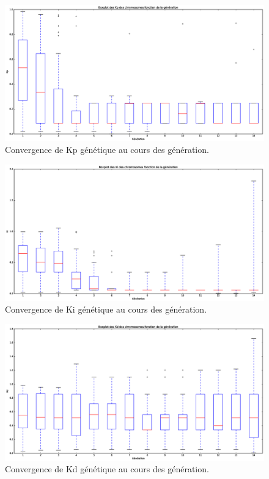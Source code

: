 \documentclass[a4paper,10pt]{report}
\begin{document}
\begin{figure}[htb!]
   \centering
   \includegraphics[scale=0.35]{KpBoxplot.eps}
    \caption{\label{fig:kpbox} Convergence de Kp génétique au cours des génération.}
\end{figure}
\begin{figure}[htb!]
   \centering
   \includegraphics[scale=0.35]{KiBoxplot.eps}
    \caption{\label{fig:kibox} Convergence de Ki génétique au cours des génération.}
\end{figure}
\begin{figure}[htb!]
   \centering
   \includegraphics[scale=0.35]{KdBoxplot.eps}
    \caption{\label{fig:kdbox} Convergence de Kd génétique au cours des génération.}
\end{figure}
\end{document}

